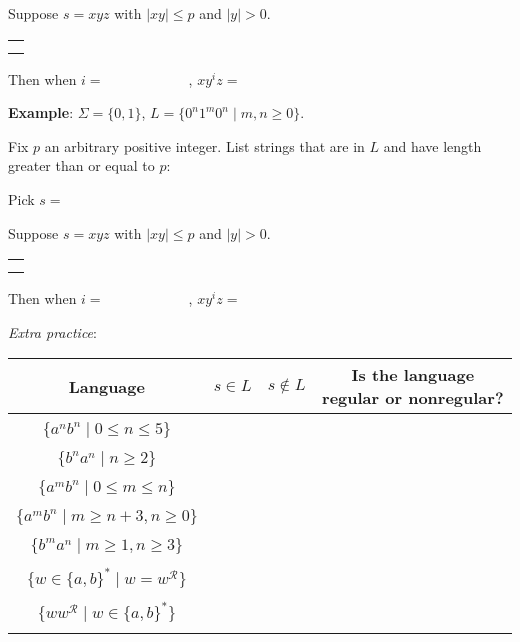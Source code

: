 \documentclass[12pt, oneside]{article}
\begin{document}
Suppose $s = xyz$ with  $|xy|  \leq  p$ and $|y| > 0$.
\begin{center}
\begin{tabular}{|c|}
\hline
 \\
\hspace{4in} \\
\hline
\end{tabular}
\end{center}
Then when $i = \hspace{1in}$, $xy^i z  = \hspace{1in}$


\vfill


{\bf Example}: $\Sigma  =  \{0,1\}$, $L = \{0^n1^m0^n  \mid m,n  \geq 0\}$.

Fix $p$ an arbitrary positive integer. List strings that are in $L$ and have length  greater than or equal  to $p$:

\vspace{10pt}

Pick $s = $


Suppose $s = xyz$ with  $|xy|  \leq  p$ and $|y| > 0$.
\begin{center}
\begin{tabular}{|c|}
\hline
 \\
\hspace{4in} \\
\hline
\end{tabular}
\end{center}
Then when $i = \hspace{1in}$, $xy^i z  = \hspace{1in}$

\newpage
{\it Extra practice}:


\begin{center}
    \begin{tabular}{c|c| c| c}
    Language & $s \in L$ & $s \notin L$ & Is the language regular or nonregular?  \\
    \hline
     & \hspace{1in} & \hspace{1in}  &  \\
    $\{a^nb^n \mid 0  \leq n  \leq 5 \}$ & & & \\
     & & & \\
    $\{b^n a^n \mid  n  \geq 2\}$  & & & \\
     & & & \\
    $\{a^m b^n \mid  0 \leq m\leq n\}$  & & & \\
     & & & \\
    $\{a^m b^n \mid  m \geq n+3,  n \geq 0\}$  & & & \\
     & & & \\
    $\{b^m a^n \mid  m \geq 1, n \geq  3\}$  & & & \\
     & & & \\
    $\{ w  \in \{a,b\}^* \mid w = w^\mathcal{R} \}$ & & & \\
     & & & \\ 
    $\{ ww^\mathcal{R} \mid w\in \{a,b\}^* \}$ & & & \\
     & & & \\ 
    \end{tabular}
\end{center}
     \vfill
\end{document}
